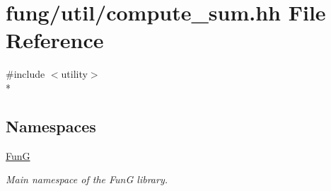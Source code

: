 \hypertarget{compute__sum_8hh}{}\section{fung/util/compute\+\_\+sum.hh File Reference}
\label{compute__sum_8hh}
{\ttfamily \#include $<$utility$>$}\\*
\subsection*{Namespaces}
\begin{DoxyCompactItemize}
\item 
 \hyperlink{namespaceFunG}{Fun\+G}
\begin{DoxyCompactList}\small\item\em Main namespace of the Fun\+G library. \end{DoxyCompactList}\end{DoxyCompactItemize}
